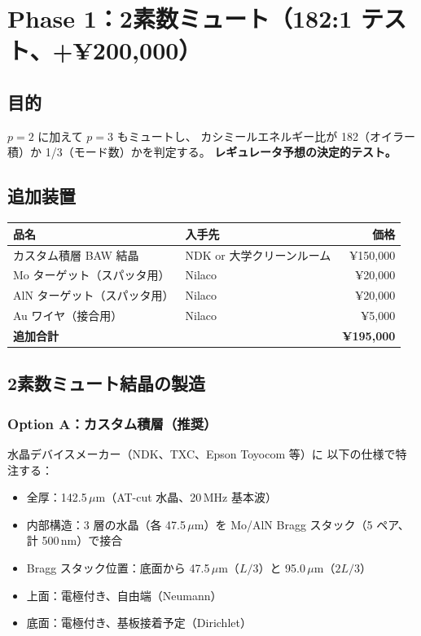 \documentclass[11pt,a4paper]{article}
\begin{document}
\section{Phase 1：2素数ミュート（182:1 テスト、+¥200,000）}

\subsection{目的}

$p = 2$ に加えて $p = 3$ もミュートし、
カシミールエネルギー比が 182（オイラー積）か 1/3（モード数）かを判定する。
\textbf{レギュレータ予想の決定的テスト。}

\subsection{追加装置}

\begin{tcolorbox}[colback=blue!5,colframe=blue!50!black,title=Phase 1 追加部品]
\begin{tabular}{llr}
\toprule
品名 & 入手先 & 価格 \\
\midrule
カスタム積層 BAW 結晶 & NDK or 大学クリーンルーム & ¥150,000 \\
Mo ターゲット（スパッタ用）& Nilaco & ¥20,000 \\
AlN ターゲット（スパッタ用）& Nilaco & ¥20,000 \\
Au ワイヤ（接合用）& Nilaco & ¥5,000 \\
\midrule
\textbf{追加合計} & & \textbf{¥195,000} \\
\bottomrule
\end{tabular}
\end{tcolorbox}

\subsection{2素数ミュート結晶の製造}

\subsubsection{Option A：カスタム積層（推奨）}

水晶デバイスメーカー（NDK、TXC、Epson Toyocom 等）に
以下の仕様で特注する：

\begin{tcolorbox}[colback=yellow!5,colframe=yellow!50!black,title=特注仕様]
\begin{itemize}
\item 全厚：142.5\,$\mu$m（AT-cut 水晶、20\,MHz 基本波）
\item 内部構造：3 層の水晶（各 47.5\,$\mu$m）を
  Mo/AlN Bragg スタック（5 ペア、計 500\,nm）で接合
\item Bragg スタック位置：底面から 47.5\,$\mu$m（$L/3$）と
  95.0\,$\mu$m（$2L/3$）
\item 上面：電極付き、自由端（Neumann）
\item 底面：電極付き、基板接着予定（Dirichlet）
\end{itemize}
\end{tcolorbox}
\end{document}
